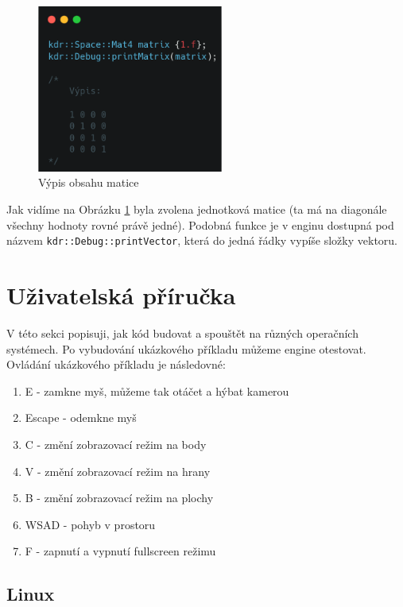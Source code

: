 \documentclass[12pt]{article}
\begin{document}
\vspace{0.5cm}
\begin{figure}[!h]
    \centering
    \includegraphics[height=5.5cm]{images/matrix_debug.png}
    \caption{Výpis obsahu matice}
    \label{fig:Výpis obsahu matice}
\end{figure}

Jak vidíme na Obrázku \ref{fig:Výpis obsahu matice} byla zvolena jednotková matice (ta má na diagonále všechny hodnoty rovné právě jedné). Podobná funkce je v enginu dostupná pod názvem \texttt{kdr::Debug::printVector}, která do jedná řádky vypíše složky vektoru.

\section{Uživatelská příručka}

V této sekci popisuji, jak kód budovat a spouštět na různých operačních systémech. Po vybudování ukázkového příkladu můžeme engine otestovat. Ovládání ukázkového příkladu je následovné:

\begin{enumerate}
    \item E - zamkne myš, můžeme tak otáčet a hýbat kamerou
    \item Escape - odemkne myš
    \item C - změní zobrazovací režim na body
    \item V - změní zobrazovací režim na hrany
    \item B - změní zobrazovací režim na plochy
    \item WSAD - pohyb v prostoru
    \item F - zapnutí a vypnutí fullscreen režimu
\end{enumerate}

\subsection{Linux}
\end{document}
